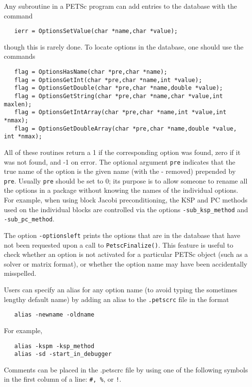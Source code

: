 Any subroutine in a PETSc program can add entries to the database with the 
command 
\begin{verbatim}
   ierr = OptionsSetValue(char *name,char *value);
\end{verbatim}
though this is rarely done.
To locate options in the database, one should use the
commands  
\begin{verbatim}
   flag = OptionsHasName(char *pre,char *name);
   flag = OptionsGetInt(char *pre,char *name,int *value);
   flag = OptionsGetDouble(char *pre,char *name,double *value);
   flag = OptionsGetString(char *pre,char *name,char *value,int maxlen);
   flag = OptionsGetIntArray(char *pre,char *name,int *value,int *nmax);
   flag = OptionsGetDoubleArray(char *pre,char *name,double *value, int *nmax);
\end{verbatim}
All 
of  
these 
routines return a 1 if the corresponding option was found,
zero if it was not found, and -1 on error.
The optional argument {\tt pre} indicates that the true name of the 
option is the given name (with the - removed) prepended by {\tt pre}.
Usually {\tt pre} should be set to 0; its purpose is to allow someone to 
rename all the options in a package without knowing the names 
of the individual options.  For example, when using block Jacobi 
preconditioning, the KSP and PC methods used on the individual 
blocks are controlled via the options {\tt -sub\_ksp\_method} and
{\tt -sub\_pc\_method}. 
 
The option {\tt -optionsleft}  prints the options 
that are in the database 
that have not been requested upon a call to {\tt PetscFinalize()}. 
This feature is useful to check whether an option is not activated for
a particular PETSc object (such as a solver or matrix format), or 
whether the option name may have been accidentally misspelled.

Users can specify an alias for any option name (to avoid typing the 
sometimes lengthy default name) by adding an alias to the 
{\tt .petscrc}  file in the format
 
\begin{verbatim}
   alias -newname -oldname
\end{verbatim}
For example,
\begin{verbatim}
   alias -kspm -ksp_method
   alias -sd -start_in_debugger
\end{verbatim}
Comments can be placed in the .petscrc file by using one of the
following symbols in the first column of a line: {\tt \#, \%}, or {\tt !}.

